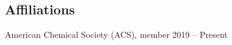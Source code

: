 \documentclass[margin,line]{resumecls}
\begin{document}
\begin{resume}




\vspace{1mm}
    \section{\mysidestyle Affiliations}

    American Chemical Society (ACS), member 2019 -- Present

\end{resume}
\end{document}
